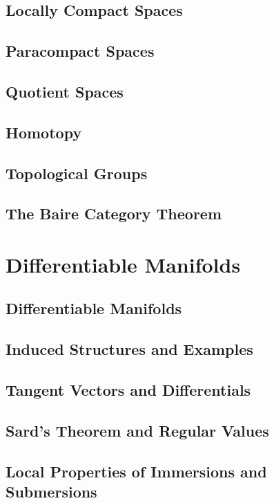 \documentclass[oneside]{amsbook}
\numberwithin{prob}{section}
\begin{document}
\section{Locally Compact Spaces}

\section{Paracompact Spaces}

\section{Quotient Spaces}

\section{Homotopy}

\section{Topological Groups}

\setcounter{section}{16}
\section{The Baire Category Theorem}


\chapter{Differentiable Manifolds}
\setcounter{section}{1}
\section{Differentiable Manifolds}

\setcounter{section}{3}
\section{Induced Structures and Examples}

\section{Tangent Vectors and Differentials}

\section{Sard's Theorem and Regular Values}

\section{Local Properties of Immersions and Submersions}

\end{document}
